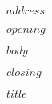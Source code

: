 \documentclass[$campus$,$dept$,$if(fontsize)$$fontsize$,$endif$]{ucletter}
\begin{document}
\begin{letter}{
   $address$
 }


 \opening{$opening$}

$body$
 
\closing{$closing$ \\
\vspace{1cm}
}

$title$
\end{letter}
\end{document}
